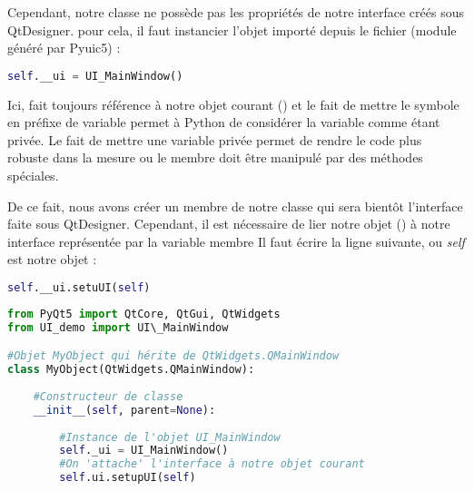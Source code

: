 Cependant, notre classe  ne possède pas les propriétés de notre interface créés sous QtDesigner. pour cela, il faut instancier l'objet importé depuis le fichier  (module généré par Pyuic5) : 

\begin{lstlisting}[language=Python]
        self.__ui = UI_MainWindow()
\end{lstlisting}

Ici,  fait toujours référence à notre objet courant () et le fait de mettre le symbole \bold{\_\_} en préfixe de variable permet à Python de considérer la variable comme étant privée. \newline 
Le fait de mettre une variable privée permet de rendre le code plus robuste dans la mesure ou le membre doit être manipulé par des méthodes spéciales.\newline


De ce fait, nous avons créer un membre de notre classe qui sera bientôt l'interface faite sous QtDesigner. \newline
Cependant, il est nécessaire de lier notre objet () à notre interface représentée par la variable membre  \newline
Il faut écrire la ligne suivante, ou \textit{self} est notre objet  : 

\begin{lstlisting}[language=Python]
        self.__ui.setuUI(self)
\end{lstlisting}




\begin{lstlisting}[language=Python]
from PyQt5 import QtCore, QtGui, QtWidgets
from UI_demo import UI\_MainWindow

#Objet MyObject qui hérite de QtWidgets.QMainWindow
class MyObject(QtWidgets.QMainWindow):
    
    #Constructeur de classe
    __init__(self, parent=None):
        
        #Instance de l'objet UI_MainWindow
        self._ui = UI_MainWindow()
        #On 'attache' l'interface à notre objet courant
        self.ui.setupUI(self)

\end{lstlisting}




